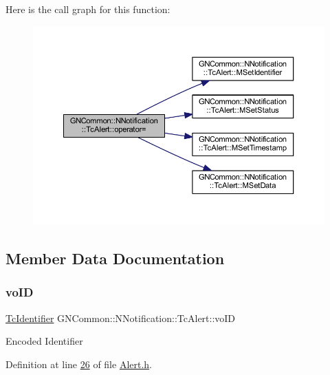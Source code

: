 Here is the call graph for this function\+:
\nopagebreak
\begin{figure}[H]
\begin{center}
\leavevmode
\includegraphics[width=350pt]{class_g_n_common_1_1_n_notification_1_1_tc_alert_ad1371ff2988283b60a47c2879e1a0011_cgraph}
\end{center}
\end{figure}


\subsection{Member Data Documentation}
\mbox{\label{class_g_n_common_1_1_n_notification_1_1_tc_alert_aa42573703fd6fa2ba90aa010fdc659ca}} 
\subsubsection{\texorpdfstring{vo\+ID}{voID}}
{\footnotesize\ttfamily \mbox{\hyperlink{class_g_n_common_1_1_n_notification_1_1_tc_identifier}{Tc\+Identifier}} G\+N\+Common\+::\+N\+Notification\+::\+Tc\+Alert\+::vo\+ID\hspace{0.3cm}{\ttfamily [protected]}}

Encoded Identifier 

Definition at line \mbox{\hyperlink{_alert_8h_source_l00026}{26}} of file \mbox{\hyperlink{_alert_8h_source}{Alert.\+h}}.

